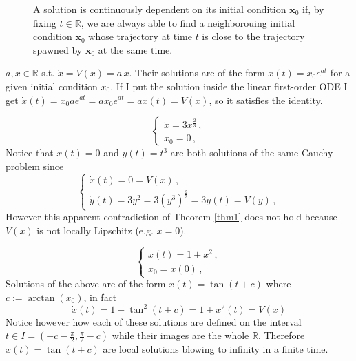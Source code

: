 \documentclass[../main.tex]{subfiles}
\begin{document}
   \begin{figure}[H]
       \centering 
       \caption{A solution is continuously dependent on its initial condition $\boldsymbol{x}_{0}$ if, by fixing $t\in \mathbb{R}$, we are always able to find a neighborouing initial condition $\boldsymbol{x}_{0}$ whose trajectory at time $t$ is close to the trajectory spawned by $\boldsymbol{x}_{0}$ at the same time.}
       \label{fig}
   \end{figure}
   \begin{example}[label=ex1]{}{}
           $a,x\in \mathbb{R}$ s.t. $\dot{x}=V(x)=a\,x$. Their solutions are of the form $x(t)=x_{0}e^{at}$ for a given initial condition $x_{0}$. If I put the solution inside the linear first-order ODE I get $\dot{x}(t)=x_{0}ae^{at}=ax_{0}e^{at}=ax(t)=V(x)$, so it satisfies the identity.
   \end{example}
   \begin{example}[label=ex2]{}{}
        \begin{equation}\label{eq7}
           \begin{cases}
                   \dot{x} = 3x^{\frac{2}{3}} \,, \\
              x_{0} = 0 \,, 
           \end{cases}
        \end{equation}
        Notice that $x(t)=0$ and $y(t)=t^{3}$ are both solutions of the same Cauchy problem since
        \begin{equation}\label{eq8}
           \begin{cases}
                   \dot{x}(t) = 0 = V(x) \,, \\
                   \dot{y}(t) = 3y^{2} = 3 (y^{3})^{\frac{2}{3}} = 3 y(t) = V(y)\,, 
           \end{cases}
        \end{equation}
        However this apparent contradiction of Theorem \ref{thm1} does not hold because $V(x)$ is not locally Lipschitz (e.g. $x=0$).
   \end{example}
   \begin{example}[label=ex3]{}{}
        \begin{equation}\label{eq9}
           \begin{cases}
                   \dot{x}(t) = 1+ x^{2} \,, \\
                   x_{0} = x(0) \,, 
           \end{cases}
        \end{equation}
        Solutions of the above are of the form $x(t)=\tan(t+c)$ where $c:=\arctan(x_{0})$, in fact
        \begin{equation}\label{eq10}
                \dot{x}(t) = 1+\tan^{2}(t+c) = 1 + x^{2}(t) = V(x)
        \end{equation}
       Notice however how each of these solutions are defined on the interval $t\in I=(-c-\frac{\pi}{2},\frac{\pi}{2}-c)$ while their images are the whole $\mathbb{R}$. Therefore $x(t)=\tan(t+c)$ are local solutions blowing to infinity in a finite time.
   \end{example}
\end{document}

